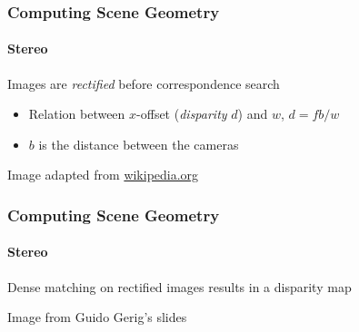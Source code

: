 \documentclass[xetex,professionalfont]{beamer}
\begin{document}

\begin{frame}
\frametitle{Computing Scene Geometry}
\framesubtitle{Stereo}

Images are \emph{rectified} before correspondence search %
\begin{itemize}
    \item Relation between $x$-offset (\emph{disparity} $d$) and $w$, $d=fb/w$ %
    \item $b$ is the distance between the cameras 
\end{itemize}


\bigskip
\begin{center}
    {\centering Image adapted from \url{wikipedia.org}}
\end{center}

\end{frame}


\begin{frame}
\frametitle{Computing Scene Geometry}
\framesubtitle{Stereo}

Dense matching on rectified images results in a disparity map

\bigskip
\begin{center}
    {\centering Image from Guido Gerig's slides}
\end{center}

\end{frame}
\end{document}
